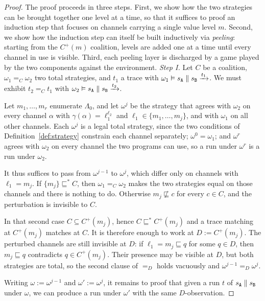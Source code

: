 \documentclass[preprint,5p,twocolumn]{elsarticle}
\begin{document}
\begin{proof}

The proof proceeds in three steps. First, we show how the two strategies can be brought together
one level at a time, so that it suffices to proof an induction step that focuses on channels
carrying a single value level $m$.
Second, we show how the induction step can itself be built inductively via
\emph{peeling}: starting from the $C^+(m)$ coalition, levels are added one at a
time until every channel in
use is visible. Third, each peeling layer is discharged by a game played by
the two components against the environment.
  \emph{Step I.} Let $C$ be a coalition, $\omega_1 =_C \omega_2$ two total strategies, and $t_1$ a trace with
  $\omega_1 \vDash s_{\mathtt{A}} \parallel s_{\mathtt{B}} \xrightarrow{t_1}$. We must exhibit $t_2 =_C t_1$ with
  $\omega_2 \vDash s_{\mathtt{A}} \parallel s_{\mathtt{B}} \xrightarrow{t_2}$.

  Let $m_1,\dots,m_r$ enumerate $\Lambda_0$, and let $\omega^j$
  be the strategy that agrees with $\omega_2$ on every channel $\alpha$ with
  $\gamma(\alpha) = \ell_1^{\ell_2}$ and $\ell_1 \in \lbrace m_1,\dots,m_j \rbrace$, and with
  $\omega_1$ on all other channels. Each $\omega^j$ is a legal total strategy, since the two
  conditions of Definition~\ref{def:strategy} constrain each channel separately; $\omega^0 =
  \omega_1$; and $\omega^r$ agrees with $\omega_2$ on every channel the two programs can use, so a
  run under $\omega^r$ is a run under $\omega_2$.

  It thus suffices to pass from $\omega^{j-1}$ to $\omega^j$, which differ only on channels with
  $\ell_1 = m_j$. If $\lbrace m_j \rbrace \sqsubseteq^* C$, then $\omega_1 =_C \omega_2$ makes the
  two strategies equal on those channels and there is nothing to do. Otherwise $m_j \not\sqsubseteq
  c$ for every $c \in C$, and the perturbation is invisible to $C$.

  In that second case $C \subseteq C^+(m_j)$, hence
  $C \sqsubseteq^* C^+(m_j)$ and a trace matching at $C^+(m_j)$ matches at $C$. It is therefore
  enough to work at $D := C^+(m_j)$. The
  perturbed channels are still invisible at $D$: if $\ell_1 = m_j \sqsubseteq q$ for some $q \in D$,
  then $m_j \sqsubseteq q$ contradicts $q \in C^+(m_j)$. Their presence may be visible at $D$,
  but both strategies are total, so the second clause of $=_D$ holds vacuously and
  $\omega^{j-1} =_D \omega^j$.

  Writing $\omega := \omega^{j-1}$ and $\omega' := \omega^j$, it remains to proof that given a run $t$ of
  $s_{\mathtt{A}} \parallel s_{\mathtt{B}}$ under $\omega$, we can produce a run under $\omega'$ with the same $D$-observation.


\end{proof}
\end{document}
